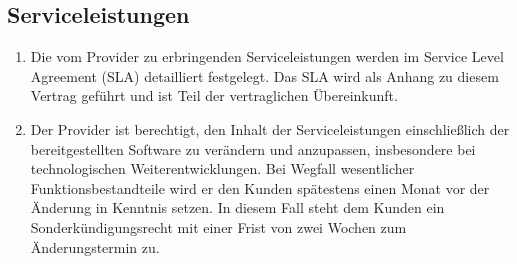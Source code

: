 \documentclass{terms}
\begin{document}
\subsection{Serviceleistungen}
\begin{enumerate}
\item Die vom Provider zu erbringenden Serviceleistungen werden im Service Level Agreement (SLA) detailliert festgelegt. Das SLA wird als Anhang zu diesem Vertrag geführt und ist Teil der vertraglichen Übereinkunft.
\item Der Provider ist berechtigt, den Inhalt der Serviceleistungen einschließlich der bereitgestellten Software zu verändern und anzupassen, insbesondere bei technologischen Weiterentwicklungen. Bei Wegfall wesentlicher Funktionsbestandteile wird er den Kunden spätestens einen Monat vor der Änderung in Kenntnis setzen. In diesem Fall steht dem Kunden ein Sonderkündigungsrecht mit einer Frist von zwei Wochen zum Änderungstermin zu.
\end{enumerate}
\end{document}

